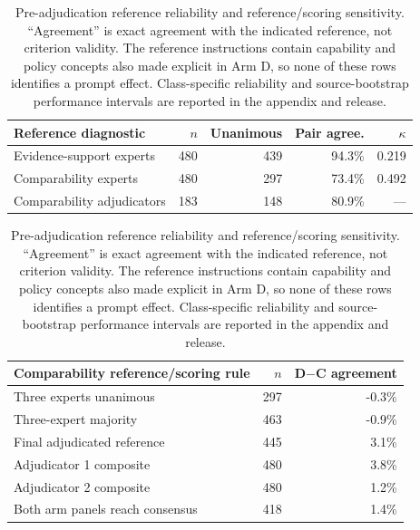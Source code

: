 \begin{table}[t]
\centering
\small
\setlength{\tabcolsep}{5pt}
\begin{tabular}{lrrrr}
\toprule
\textbf{Reference diagnostic} & \textbf{$n$} &
\textbf{Unanimous} & \textbf{Pair agree.} & \textbf{$\kappa$} \\
\midrule
Evidence-support experts & 480 &
439 &
94.3\% &
0.219 \\
Comparability experts & 480 &
297 &
73.4\% &
0.492 \\
Comparability adjudicators & 183 &
148 &
80.9\% &
--- \\
\bottomrule
\end{tabular}

\vspace{4pt}
\begin{tabular}{lrr}
\toprule
\textbf{Comparability reference/scoring rule} & \textbf{$n$} &
\textbf{D$-$C agreement} \\
\midrule
Three experts unanimous &
297 &
-0.3\% \\
Three-expert majority &
463 &
-0.9\% \\
Final adjudicated reference &
445 &
3.1\% \\
Adjudicator 1 composite &
480 &
3.8\% \\
Adjudicator 2 composite &
480 &
1.2\% \\
Both arm panels reach consensus &
418 &
1.4\% \\
\bottomrule
\end{tabular}
\caption{Pre-adjudication reference reliability and reference/scoring
sensitivity. ``Agreement'' is exact agreement with the indicated reference,
not criterion validity. The reference instructions contain capability and
policy concepts also made explicit in Arm D, so none of these rows identifies
a prompt effect. Class-specific reliability and source-bootstrap performance
intervals are reported in the appendix and release.}
\label{tab:main-v3-reference-diagnostics}
\end{table}
